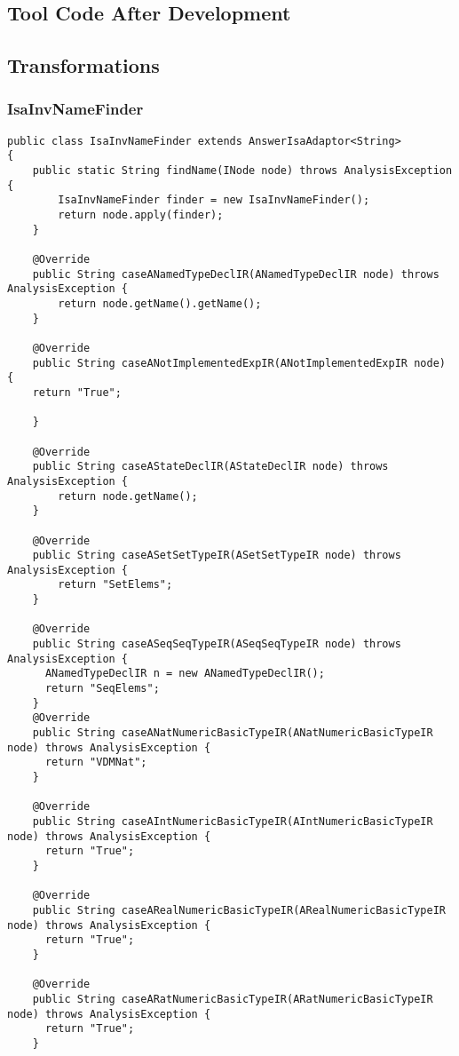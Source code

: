 \begin{appendices}
\chapter{Tool Code After Development} \label{aftercode}
\section{Transformations} \label{transformationsafter}

\subsection{IsaInvNameFinder} \label{IsaInvNameFinderafter}
\begin{lstlisting}
public class IsaInvNameFinder extends AnswerIsaAdaptor<String>
{
    public static String findName(INode node) throws AnalysisException {
        IsaInvNameFinder finder = new IsaInvNameFinder();
        return node.apply(finder);
    }

    @Override
    public String caseANamedTypeDeclIR(ANamedTypeDeclIR node) throws AnalysisException {
        return node.getName().getName();
    }
    
    @Override
    public String caseANotImplementedExpIR(ANotImplementedExpIR node) {
    return "True";
      
    }
    
    @Override
    public String caseAStateDeclIR(AStateDeclIR node) throws AnalysisException {
        return node.getName();
    }
    
    @Override
    public String caseASetSetTypeIR(ASetSetTypeIR node) throws AnalysisException {
        return "SetElems";
    }
    
    @Override
    public String caseASeqSeqTypeIR(ASeqSeqTypeIR node) throws AnalysisException {
      ANamedTypeDeclIR n = new ANamedTypeDeclIR();
      return "SeqElems";
    }
    @Override
    public String caseANatNumericBasicTypeIR(ANatNumericBasicTypeIR node) throws AnalysisException {
      return "VDMNat";
    }
    
    @Override
    public String caseAIntNumericBasicTypeIR(AIntNumericBasicTypeIR node) throws AnalysisException {
      return "True";
    }
    
    @Override
    public String caseARealNumericBasicTypeIR(ARealNumericBasicTypeIR node) throws AnalysisException {
      return "True";
    }
    
    @Override
    public String caseARatNumericBasicTypeIR(ARatNumericBasicTypeIR node) throws AnalysisException {
      return "True";
    }
    

\end{lstlisting}
\end{appendices}

